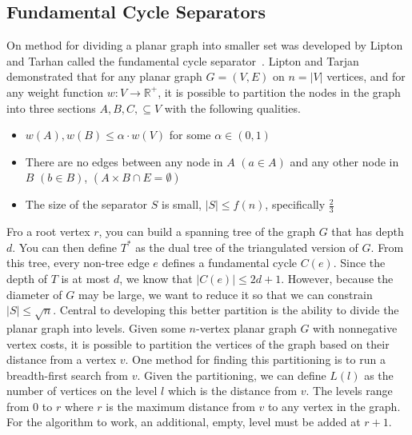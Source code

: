 \documentclass[12pt]{article}
\begin{document}
    \subsection{Fundamental Cycle Separators}
    \label{sec:graph-sep-fund-cycle-sep}

    On method for dividing a planar graph into smaller set was developed by Lipton and Tarhan called the fundamental cycle separator~\cite{lipton1979separator}. Lipton and Tarjan demonstrated that for any planar graph $G = (V,E)$ on $n = |V|$ vertices, and for any weight function $w: V \rightarrow \mathbb{R}^+$, it is possible to partition the nodes in the graph into three sections $A, B, C, \subseteq V$ with the following qualities.
    \begin{itemize}
        \item $w(A), w(B) \leq \alpha \cdot w(V)$ for some $\alpha \in (0,1)$

        \item There are no edges between any node in $A$ $(a \in A)$ and any other node in $B$ $(b \in B)$, $(A \times B \cap E = \emptyset)$

        \item The size of the separator $S$ is small, $|S| \leq f(n)$, specifically $\frac{2}{3}$
    \end{itemize}

    Fro a root vertex $r$, you can build a spanning tree of the graph $G$ that has depth $d$. You can then define $T^*$ as the dual tree of the triangulated version of $G$. From this tree, every non-tree edge $e$ defines a fundamental cycle $C(e)$. Since the depth of $T$ is at most $d$, we know that $|C(e)| \leq 2d + 1$. However, because the diameter of $G$ may be large, we want to reduce it so that we can constrain $|S| \leq \sqrt{n}$. Central to developing this better partition is the ability to divide the planar graph into levels. Given some $n$-vertex planar graph $G$ with nonnegative vertex costs, it is possible to partition the vertices of the graph based on their distance from a vertex $v$. One method for finding this partitioning is to run a breadth-first search from $v$. Given the partitioning, we can define $L(l)$ as the number of vertices on the level $l$ which is the distance from $v$. The levels range from $0$ to $r$ where $r$ is the maximum distance from $v$ to any vertex in the graph. For the algorithm to work, an additional, empty, level must be added at $r+1$.
\end{document}
